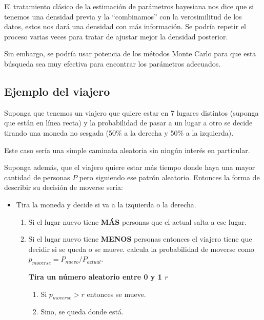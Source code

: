 \documentclass[
  12pt,
]{book}
\providecommand{\tightlist}{%
  \setlength{\itemsep}{0pt}\setlength{\parskip}{0pt}}
\theoremstyle{definition}
\theoremstyle{definition}
\theoremstyle{definition}
\theoremstyle{remark}
\begin{document}
El tratamiento clásico de la estimación de parámetros bayesiana nos dice que si tenemos una densidad previa y la ``combinamos'' con la verosimilitud de los datos, estos nos dará una densidad con más información. Se podría repetir el proceso varias veces para tratar de ajustar mejor la densidad posterior.

Sin embargo, se podría usar potencia de los métodos Monte Carlo para que esta búsqueda sea muy efectiva para encontrar los parámetros adecuados.

\hypertarget{ejemplo-del-viajero}{%
\subsection{Ejemplo del viajero}\label{ejemplo-del-viajero}}

Suponga que tenemos un viajero que quiere estar en 7 lugares distintos (suponga que están en línea recta) y la probabilidad de pasar a un lugar a otro se decide tirando una moneda no sesgada (50\% a la derecha y 50\% a la izquierda).

Este caso sería una simple caminata aleatoria sin ningún interés en particular.

Suponga además, que el viajero quiere estar más tiempo donde haya una mayor cantidad de personas \(P\) pero siguiendo ese patrón aleatorio. Entonces la forma de describir su decisión de moverse sería:

\begin{itemize}
\tightlist
\item
  Tira la moneda y decide si va a la izquierda o la derecha.

  \begin{enumerate}
  \def\labelenumi{\arabic{enumi}.}
  \item
    Si el lugar nuevo tiene \textbf{MÁS} personas que el actual salta a ese lugar.
  \item
    Si el lugar nuevo tiene \textbf{MENOS} personas entonces el viajero tiene que decidir si se queda o se mueve. \textbar{} calcula la probabilidad de moverse como \(p_{moverse} = P_{nuevo}/P_{actual}\).

    \textbf{Tira un número aleatorio entre 0 y 1 \(r\)}

    \begin{enumerate}
    \def\labelenumii{\arabic{enumii}.}
    \tightlist
    \item
      Si \(p_{moverse}>r\) entonces se mueve.
    \item
      Sino, se queda donde está.
    \end{enumerate}
  \end{enumerate}
\end{itemize}
\end{document}
